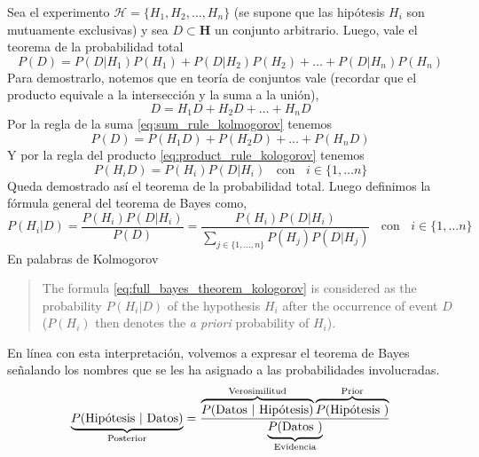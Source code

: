 \documentclass[a4paper,11pt]{book}
\theoremstyle{definition}
\begin{document}
Sea el experimento $\mathcal{H}= \{ H_1, H_2, \dots, H_n \}$ (se supone que las hip\'otesis $H_i$ son mutuamente exclusivas) y sea $D \subset \textbf{H}$ un conjunto arbitrario.
%
Luego, vale el teorema de la probabilidad total
%
\begin{equation}
P(D) = P(D|H_1)P(H_1) + P(D|H_2)P(H_2) + \dots + P(D|H_n)P(H_n)
\end{equation}
%
Para demostrarlo, notemos que en teor\'ia de conjuntos vale (recordar que el producto equivale a la intersecci\'on y la suma a la uni\'on),
%
\begin{equation*}
D = H_1D + H_2D + \dots + H_nD
\end{equation*}
%
Por la regla de la suma \eqref{eq:sum_rule_kolmogorov} tenemos
%
\begin{equation*}
P(D) = P(H_1D) + P(H_2D) + \dots + P(H_nD)
\end{equation*}
%
Y por la regla del producto \eqref{eq:product_rule_kologorov} tenemos
%
\begin{equation*}
P(H_i D ) = P(H_i) P(D|H_i) \ \ \ \ \text{con} \ \ \ \ i \in \{1,\dots n\}
\end{equation*}
%
Queda demostrado as\'i el teorema de la probabilidad total.
%
Luego definimos la f\'ormula general del teorema de Bayes como,
%
\begin{equation} \label{eq:full_bayes_theorem_kologorov}
P(H_i|D) = \frac{P(H_i) P(D|H_i)}{P(D)} = \frac{P(H_i) P(D|H_i)}{\sum_{j \in \{1, \dots, n \} } P(H_j) P(D|H_j) } \ \ \ \ \text{con} \ \ \ \ i \in \{1,\dots n\}
\end{equation}
%
En palabras de Kolmogorov
%
\begin{quotation}
The formula \eqref{eq:full_bayes_theorem_kologorov} is considered as the probability $P(H_i|D)$ of the hypothesis $H_i$ after the occurrence of event $D$ ($P(H_i)$ then denotes the \emph{a priori} probability of $H_i$).
\end{quotation}
%
En l\'inea con esta interpretaci\'on, volvemos a expresar el teorema de Bayes se\~nalando los nombres que se les ha asignado a las probabilidades involucradas.
%
\begin{equation}\label{eq:teorema_bayes}
\underbrace{P(\text{Hip\'otesis }|\text{ Datos})}_{\text{\scriptsize Posterior}} = \frac{\overbrace{P(\text{Datos }|\text{ Hip\'otesis})}^{\text{\scriptsize Verosimilitud}} \overbrace{P(\text{Hip\'otesis })}^{\text{\scriptsize Prior}} }{\underbrace{P(\text{Datos })}_{\text{\scriptsize Evidencia}}}
\end{equation}
\end{document}
